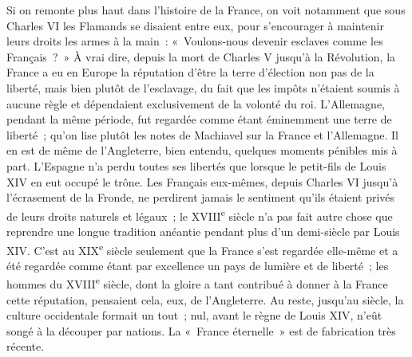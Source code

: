\documentclass[french,twoside]{book} %
\begin{document}
Si on remonte plus haut dans l'histoire de la France, on voit notamment que sous Charles VI les Flamands se disaient entre eux, pour s'encourager à maintenir leurs droits les armes à la main : « Voulons-nous devenir esclaves comme les Français ? » À vrai dire, depuis la mort de Charles V jusqu'à la Révolution, la France a eu en Europe la réputation d'être la terre d'élection non pas de la liberté, mais bien plutôt de l'esclavage, du fait que les impôts n'étaient soumis à aucune règle et dépendaient exclusivement de la volonté du roi. L'Allemagne, pendant la même période, fut regardée comme étant émi­nemment une terre de liberté ; qu'on lise plutôt les notes de Machiavel sur la France et l'Allemagne. Il en est de même de l'Angleterre, bien entendu, quelques moments pénibles mis à part. L'Espagne n'a perdu toutes ses libertés que lorsque le petit-fils de Louis XIV en eut occupé le trône. Les Français eux-mêmes, depuis Charles VI jusqu'à l'écrasement de la Fronde, ne perdirent jamais le sentiment qu'ils étaient privés de leurs droits naturels et légaux ; le XVIII\textsuperscript{e} siècle n'a pas fait autre chose que reprendre une longue tradition anéantie pendant plus d'un demi-siècle par Louis XIV. C'est au XIX\textsuperscript{e} siècle seulement que la France s'est regardée elle-même et a été regardée comme étant par excellence un pays de lumière et de liberté ; les hommes du XVIII\textsuperscript{e} siècle, dont la gloire a tant contribué à donner à la France cette réputation, pensaient cela, eux, de l'Angleterre. Au reste, jusqu'au siècle, la culture occidentale formait un tout ; nul, avant le règne de Louis XIV, n'eût songé à la découper par nations. La « France éternelle » est de fabrication très récente.
\end{document}
